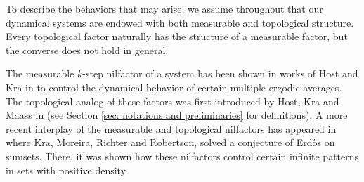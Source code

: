 \documentclass[12pt]{amsart}
\theoremstyle{definition}
\theoremstyle{plain}
\theoremstyle{definition}
\numberwithin{equation}{section}
\begin{document}
To describe the behaviors that may arise, we assume throughout that our dynamical systems are endowed with both measurable and topological structure. %
Every topological factor naturally has the structure of a measurable factor, but the converse does not hold in general. %

The measurable $k$-step nilfactor of a system has been shown in works of Host and Kra in \cite{HK paper} to control the dynamical behavior of certain multiple ergodic averages. The topological analog of these factors was first introduced by Host, Kra and Maass in \cite{Host Kra and Maass} (see Section \ref{sec: notations and preliminaries} for definitions). A more recent interplay of the measurable and topological nilfactors has appeared in \cite{a model with topological pronilfactors} where Kra, Moreira, Richter and Robertson, solved a conjecture of Erd\H{o}s on sumsets. There, it was shown how these nilfactors control certain infinite patterns in sets with positive density. %
\end{document}

